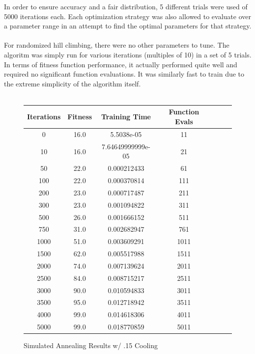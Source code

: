 \documentclass[h]{article}
\begin{document}
In order to ensure accuracy and a fair distribution, 5 different trials were 
used of 5000 iterations each.  Each optimization strategy was also allowed to evaluate over 
a parameter range in an attempt to find the optimal parameters for that 
strategy.
\\ \\
For randomized hill climbing, there were no other parameters to tune.  The 
algoritm was simply run for various iterations (multiples of 10) in a set of 5 
trials.  In terms of fitness function performance, it actually performed quite 
well and required no significant function evaluations. It was similarly fast to train due to the extreme simplicity 
of the algorithm itself. 
\\ \\
\begin{figure}[H] 
\begin{tabular}{ | c | c  | c | c | c | c | c |} 
\hline
\textbf{Iterations} & \textbf{Fitness} & \textbf{Training Time} & \textbf{Function Evals}   \\
\hline
0 & 16.0 & 5.5038e-05 & 11 \\ \hline 
10 & 16.0 & 7.64649999999e-05 & 21 \\ \hline 
50 & 22.0 & 0.000212433 & 61 \\ \hline 
100 & 22.0 & 0.000370814 & 111 \\ \hline 
200 & 23.0 & 0.000717487 & 211 \\ \hline 
300 & 23.0 & 0.001094822 & 311 \\ \hline 
500 & 26.0 & 0.001666152 & 511 \\ \hline 
750 & 31.0 & 0.002682947 & 761 \\ \hline 
1000 & 51.0 & 0.003609291 & 1011 \\ \hline 
1500 & 62.0 & 0.005517988 & 1511 \\ \hline 
2000 & 74.0 & 0.007139624 & 2011 \\ \hline 
2500 & 84.0 & 0.008715217 & 2511 \\ \hline 
3000 & 90.0 & 0.010594833 & 3011 \\ \hline 
3500 & 95.0 & 0.012718942 & 3511 \\ \hline 
4000 & 99.0 & 0.014618306 & 4011 \\ \hline 
5000 & 99.0 & 0.018770859 & 5011 \\ \hline 

\end{tabular}
\caption*{Simulated Annealing Results w/ .15 Cooling} 
\end{figure}
\end{document}
